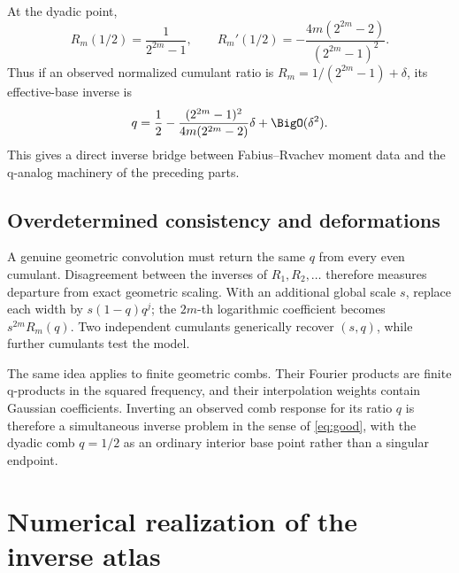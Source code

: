 \documentclass[11pt,letterpaper,oneside,openany]{book}
\theoremstyle{definition}
\theoremstyle{remark}
\begin{document}
At the dyadic point,
\begin{equation}
 R_m(1/2)=\frac1{2^{2m}-1},
 \qquad
 R_m'(1/2)=-\frac{4m(2^{2m}-2)}{(2^{2m}-1)^2}.
 \label{eq:dyadic-Rm}
\end{equation}
Thus if an observed normalized cumulant ratio is
\(R_m=1/(2^{2m}-1)+\delta\), its effective-base inverse is
\begin{equation}
 q=\frac12-
 \frac{(2^{2m}-1)^2}{4m(2^{2m}-2)}\delta+\BigO(\delta^2).
 \label{eq:effective-dyadic-base}
\end{equation}
This gives a direct inverse bridge between Fabius--Rvachev moment data and the
q-analog machinery of the preceding parts.

\section{Overdetermined consistency and deformations}
A genuine geometric convolution must return the same \(q\) from every even
cumulant.  Disagreement between the inverses of \(R_1,R_2,\ldots\) therefore
measures departure from exact geometric scaling.  With an additional global
scale \(s\), replace each width by \(s(1-q)q^j\); the \(2m\)-th logarithmic
coefficient becomes \(s^{2m}R_m(q)\).  Two independent cumulants generically
recover \((s,q)\), while further cumulants test the model.

The same idea applies to finite geometric combs.  Their Fourier products are
finite q-products in the squared frequency, and their interpolation weights
contain Gaussian coefficients.  Inverting an observed comb response for its
ratio \(q\) is therefore a simultaneous inverse problem in the sense of
\cref{eq:good}, with the dyadic comb \(q=1/2\) as an ordinary interior base
point rather than a singular endpoint.

\chapter{Numerical realization of the inverse atlas}
\end{document}
